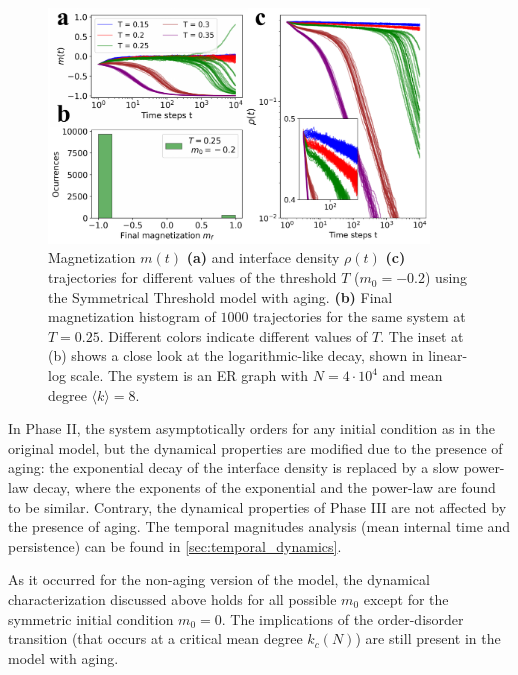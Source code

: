 \begin{figure}
    \centering \captionsetup{font=sf}
    \includegraphics[width=0.9\textwidth]{Figs/Aging_STM/FIG7.pdf}
    \caption[Phase ${\rm I}^{*}$ slow decay and minority consensus]{\label{fig:mixed_phase} Magnetization $m(t)$ \textbf{(a)} and interface density $\rho(t)$ \textbf{(c)} trajectories for different values of the threshold $T$ ($m_0 = -0.2$) using the Symmetrical Threshold model with aging. \textbf{(b)} Final magnetization histogram of $1000$ trajectories for the same system at $T=0.25$. Different colors indicate different values of $T$. The inset at (b) shows a close look at the logarithmic-like decay, shown in linear-log scale. The system is an ER graph with $N = 4 \cdot 10^4$ and mean degree $\langle k \rangle = 8$.}
\end{figure}
In Phase II, the system asymptotically orders for any initial condition as in the original model, but the dynamical properties are modified due to the presence of aging: the exponential decay of the interface density is replaced by a slow power-law decay, where the exponents of the exponential and the power-law are found to be similar. Contrary, the dynamical properties of Phase III are not affected by the presence of aging. The temporal magnitudes analysis (mean internal time and persistence) can be found in \ref{sec:temporal_dynamics}. 

As it occurred for the non-aging version of the model, the dynamical characterization discussed above holds for all possible
$m_0$ except for the symmetric initial condition $m_0 = 0$. The implications of the order-disorder transition (that occurs at a critical mean degree $k_c (N)$) \cite{Konstantin} are still present in the model with aging.

